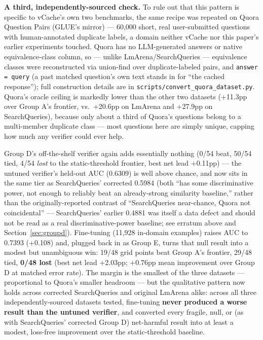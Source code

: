 \documentclass[11pt]{article}
\begin{document}
\textbf{A third, independently-sourced check.} To rule out that this pattern is specific to vCache's own two benchmarks, the same recipe was repeated on Quora Question Pairs (GLUE's mirror) --- 60,000 short, real user-submitted questions with human-annotated duplicate labels, a domain neither vCache nor this paper's earlier experiments touched. Quora has no LLM-generated answers or native equivalence-class column, so --- unlike LmArena/SearchQueries --- equivalence classes were reconstructed via union-find over duplicate-labeled pairs, and \texttt{answer = query} (a past matched question's own text stands in for ``the cached response''); full construction details are in \texttt{scripts/\allowbreak{}convert\_\allowbreak{}quora\_\allowbreak{}dataset.\allowbreak{}py}. Quora's oracle ceiling is markedly lower than the other two datasets (+11.3pp over Group A's frontier, vs.\ +20.6pp on LmArena and +27.9pp on SearchQueries), because only about a third of Quora's questions belong to a multi-member duplicate class --- most questions here are simply unique, capping how much any verifier could ever help.

Group D's off-the-shelf verifier again adds essentially nothing (0/54 beat, 50/54 tied, 4/54 \emph{lost} to the static-threshold frontier, best net lead +0.11pp) --- the untuned verifier's held-out AUC (0.6309) is well above chance, and now sits in the same tier as SearchQueries' corrected 0.5984 (both ``has some discriminative power, not enough to reliably beat an already-strong similarity baseline,'' rather than the originally-reported contrast of ``SearchQueries near-chance, Quora not coincidental'' --- SearchQueries' earlier 0.4881 was itself a data defect and should not be read as a real discriminative-power baseline; see erratum above and Section~\ref{sec:groupd}). Fine-tuning (11,928 in-domain examples) raises AUC to 0.7393 (+0.108) and, plugged back in as Group E, turns that null result into a modest but unambiguous win: 19/48 grid points beat Group A's frontier, 29/48 tied, \textbf{0/48 lost} (best net lead +2.03pp; +0.76pp mean improvement over Group D at matched error rate). The margin is the smallest of the three datasets --- proportional to Quora's smaller headroom --- but the qualitative pattern now holds across corrected SearchQueries and original LmArena alike: across all three independently-sourced datasets tested, fine-tuning \textbf{never produced a worse result than the untuned verifier}, and converted every fragile, null, or (as with SearchQueries' corrected Group D) net-harmful result into at least a modest, loss-free improvement over the static-threshold baseline.
\end{document}
